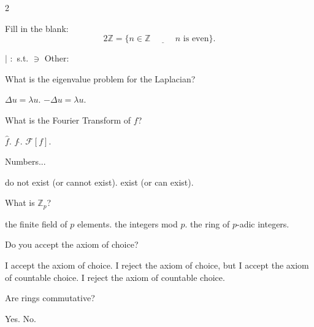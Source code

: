 \documentclass[a4paper,12pt]{exam}
\begin{document}
\begin{multicols}{2}
\begin{questions}
\begin{samepage}
    \question Fill in the blank: 
    \[2\mathbb{Z}=\{n\in \mathbb{Z}\quad \underline{~~~~} \quad n \text{ is even}\}.\]
        \begin{checkboxes}
            \choice $|$
            \choice $:$
            \choice s.t.
            \choice $\ni$ 
            \choice Other: \underline{\hspace{3cm}}
        \end{checkboxes}
    \end{samepage}
    
    \begin{samepage}
    \question What is the eigenvalue problem for the Laplacian? 
    \begin{checkboxes}
    \choice $\Delta u = \lambda u$.
    \choice $-\Delta u=\lambda u$.
    \end{checkboxes}
    \end{samepage}
    \begin{samepage}
    \question What is the Fourier Transform of $f$?
        \begin{checkboxes}
            \choice $\widehat{f}$.
            \choice $f\, \hat{}$.
            \choice $\mathcal{F}[f]$.
        \end{checkboxes}
	\end{samepage}
    \question Numbers...
        \begin{checkboxes}
            \choice do not exist (or cannot exist).
            \choice exist (or can exist).
        \end{checkboxes}

    \question What is $\mathbb{Z}_p$? 
        \begin{checkboxes}
            \choice the finite field of $p$ elements.
            \choice the integers mod $p$.
            \choice the ring of $p$-adic integers.
        \end{checkboxes}

    \question Do you accept the axiom of choice? 
        \begin{checkboxes}
            \choice I accept the axiom of choice.
            \choice I reject the axiom of choice, but I accept the axiom of countable choice.
            \choice I reject the axiom of countable choice. 
        \end{checkboxes}

    \question Are rings commutative?
        \begin{checkboxes}
            \choice Yes.
            \choice No.
        \end{checkboxes}


\end{questions}
\end{multicols}
\end{document}
